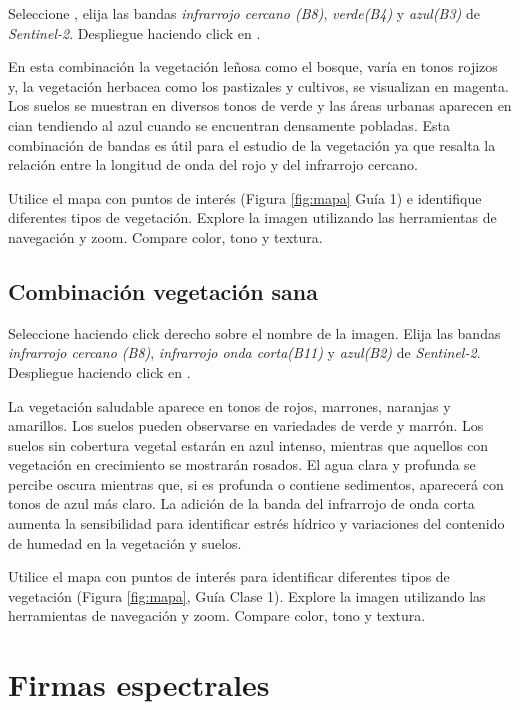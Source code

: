 Seleccione , elija las bandas \emph{infrarrojo cercano (B8)}, \emph{verde(B4)} y \emph{azul(B3)} de \emph{Sentinel-2}. Despliegue haciendo click en . 

En esta combinación la vegetación leñosa como el bosque, varía en tonos rojizos y, la vegetación herbacea como los pastizales y cultivos, se visualizan en magenta. Los suelos se muestran en diversos tonos de verde y las áreas urbanas aparecen en cian tendiendo al azul cuando se encuentran densamente pobladas.
Esta combinación de bandas es útil para el estudio de la vegetación ya que resalta la relación entre la longitud de onda del rojo y del infrarrojo cercano.

Utilice el mapa con puntos de interés (Figura \ref{fig:mapa} Guía 1) e identifique diferentes tipos de vegetación. Explore la imagen utilizando las herramientas de navegación y zoom. Compare color, tono y textura.

\subsection{Combinación vegetación sana}
\label{sec:vegetacionsana}

Seleccione  haciendo click derecho sobre el nombre de la imagen. Elija las bandas \emph{infrarrojo cercano (B8)}, \emph{infrarrojo onda corta(B11)} y \emph{azul(B2)} de \emph{Sentinel-2}. Despliegue haciendo click en .

La vegetación saludable aparece en tonos de rojos, marrones, naranjas y amarillos. Los suelos pueden observarse en variedades de verde y marrón. Los suelos sin cobertura vegetal estarán en azul intenso, mientras que aquellos con vegetación en crecimiento se mostrarán rosados. El agua clara y profunda se percibe oscura mientras que, si es profunda o contiene sedimentos, aparecerá con tonos de azul más claro.
La adición de la banda del infrarrojo de onda corta aumenta la sensibilidad para identificar estrés hídrico y variaciones del contenido de humedad en la vegetación y suelos.

Utilice el mapa con puntos de interés para identificar diferentes tipos de vegetación (Figura \ref{fig:mapa}, Guía Clase 1). Explore la imagen utilizando las herramientas de navegación y zoom. Compare color, tono y textura.

\section{Firmas espectrales}


